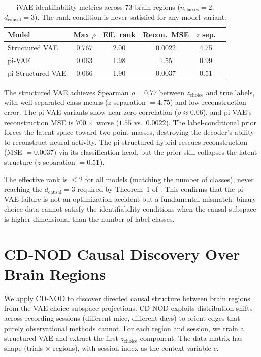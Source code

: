 \documentclass{article}
\begin{document}
\begin{table}[h]
\centering
\caption{iVAE identifiability metrics across 73 brain regions ($n_{\text{classes}} = 2$, $d_{\text{causal}} = 3$). The rank condition is never satisfied for any model variant.}
\label{tab:ivae-verification}
\small
\begin{tabular}{lccccc}
\toprule
\textbf{Model} & \textbf{Max $\rho$} & \textbf{Eff.\ rank} & \textbf{Recon.\ MSE} & \textbf{$z$ sep.} \\
\midrule
Structured VAE       & 0.767 & 2.00 & 0.0022  & 4.75 \\
pi-VAE               & 0.063 & 1.98 & 1.55    & 0.99 \\
pi-Structured VAE    & 0.066 & 1.90 & 0.0037  & 0.51 \\
\bottomrule
\end{tabular}
\end{table}

The structured VAE achieves Spearman $\rho = 0.77$ between $z_{\text{choice}}$ and true labels, with well-separated class means ($z$-separation $= 4.75$) and low reconstruction error. The pi-VAE variants show near-zero correlation ($\rho \approx 0.06$), and pi-VAE's reconstruction MSE is $700\times$ worse ($1.55$ vs.\ $0.0022$). The label-conditional prior forces the latent space toward two point masses, destroying the decoder's ability to reconstruct neural activity. The pi-structured hybrid rescues reconstruction (MSE $= 0.0037$) via its classification head, but the prior still collapses the latent structure ($z$-separation $= 0.51$).

The effective rank is $\leq 2$ for all models (matching the number of classes), never reaching the $d_{\text{causal}} = 3$ required by Theorem~1 of \citet{khemakhem2020variational}. This confirms that the pi-VAE failure is not an optimization accident but a fundamental mismatch: binary choice data cannot satisfy the identifiability conditions when the causal subspace is higher-dimensional than the number of label classes.

\section{CD-NOD Causal Discovery Over Brain Regions}
\label{app:cdnod}

We apply CD-NOD \citep{huang2020causal} to discover directed causal structure between brain regions from the VAE choice subspace projections. CD-NOD exploits distribution shifts across recording sessions (different mice, different days) to orient edges that purely observational methods cannot. For each region and session, we train a structured VAE and extract the first $z_{\text{choice}}$ component. The data matrix has shape (trials $\times$ regions), with session index as the context variable $c$.
\end{document}
